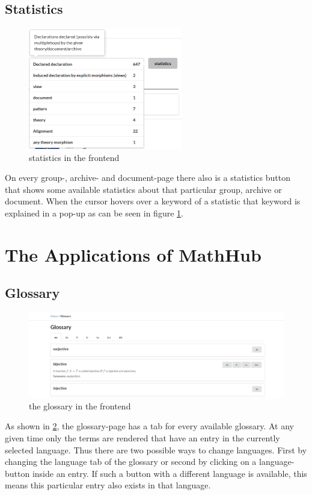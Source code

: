 \documentclass[11pt,a4paper]{article}
\begin{document}
\subsection{Statistics}
\begin{figure}[H]
\centerline{\includegraphics[width=0.6\textwidth]{statistics.png}}
\caption{statistics in the frontend}
\label{fig:stats}
\end{figure}
On every group-, archive- and document-page there also is a statistics button that shows some available statistics about that particular group, archive or document.
When the cursor hovers over a keyword of a statistic that keyword is explained in a pop-up as can be seen in figure \ref{fig:stats}.

\section{The Applications of MathHub}
\subsection{Glossary}
\begin{figure}[H]
\includegraphics[width=1\textwidth]{glossary.png}
\caption{the glossary in the frontend}
\label{fig:glossary}
\end{figure}
As shown in \ref{fig:glossary}, the glossary-page has a tab for every available glossary.
At any given time only the terms are rendered that have an entry in the currently selected language.
Thus there are two possible ways to change languages.
First by changing the language tab of the glossary or second by clicking on a language-button inside an entry.
If such a button with a different language is available, this means this particular entry also exists in that language.
\end{document}
